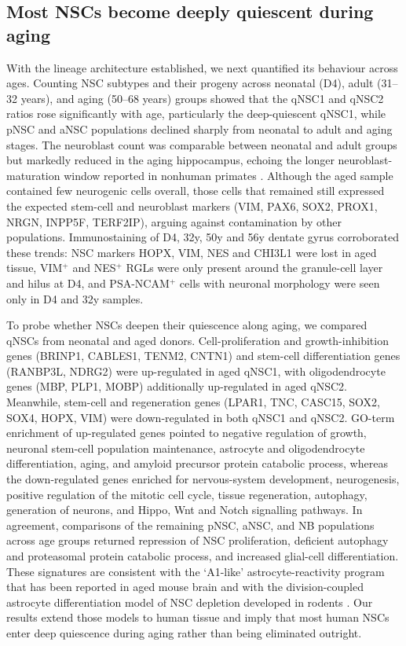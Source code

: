 \documentclass[11pt]{article}
\begin{document}
\subsection{Most NSCs become deeply quiescent during aging}

With the lineage architecture established, we next quantified its behaviour
across ages. Counting NSC subtypes and their progeny across neonatal
(D4), adult (31--32 years), and aging (50--68 years) groups showed that
the qNSC1 and qNSC2 ratios rose significantly with age, particularly the
deep-quiescent qNSC1, while pNSC and aNSC populations declined sharply
from neonatal to adult and aging stages. The neuroblast count was
comparable between neonatal and adult groups but markedly reduced in the
aging hippocampus, echoing the longer neuroblast-maturation window
reported in nonhuman primates \cite{kohler2011maturation}. Although the
aged sample contained few neurogenic cells overall, those cells that
remained still expressed the expected stem-cell and neuroblast markers
(VIM, PAX6, SOX2, PROX1, NRGN, INPP5F, TERF2IP), arguing against
contamination by other populations. Immunostaining of D4, 32y, 50y and
56y dentate gyrus corroborated these trends: NSC markers HOPX, VIM, NES
and CHI3L1 were lost in aged tissue, VIM$^+$ and NES$^+$ RGLs were only
present around the granule-cell layer and hilus at D4, and PSA-NCAM$^+$
cells with neuronal morphology were seen only in D4 and 32y samples.

To probe whether NSCs deepen their quiescence along aging, we compared
qNSCs from neonatal and aged donors. Cell-proliferation and growth-inhibition
genes (BRINP1, CABLES1, TENM2, CNTN1) and stem-cell differentiation genes
(RANBP3L, NDRG2) were up-regulated in aged qNSC1, with oligodendrocyte
genes (MBP, PLP1, MOBP) additionally up-regulated in aged qNSC2.
Meanwhile, stem-cell and regeneration genes (LPAR1, TNC, CASC15, SOX2,
SOX4, HOPX, VIM) were down-regulated in both qNSC1 and qNSC2. GO-term
enrichment of up-regulated genes pointed to negative regulation of growth,
neuronal stem-cell population maintenance, astrocyte and oligodendrocyte
differentiation, aging, and amyloid precursor protein catabolic process,
whereas the down-regulated genes enriched for nervous-system development,
neurogenesis, positive regulation of the mitotic cell cycle, tissue
regeneration, autophagy, generation of neurons, and Hippo, Wnt and Notch
signalling pathways. In agreement, comparisons of the remaining pNSC,
aNSC, and NB populations across age groups returned repression of NSC
proliferation, deficient autophagy and proteasomal protein catabolic
process, and increased glial-cell differentiation. These signatures are
consistent with the `A1-like' astrocyte-reactivity program that has been
reported in aged mouse brain \cite{clarke2018normal,liddelow2017neurotoxic}
and with the division-coupled astrocyte differentiation model of NSC
depletion developed in rodents \cite{encinas2011division}. Our results
extend those models to human tissue and imply that most human NSCs enter
deep quiescence during aging rather than being eliminated outright.
\end{document}
